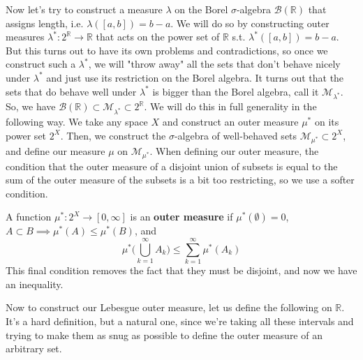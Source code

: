   Now let's try to construct a measure $\lambda$ on the Borel $\sigma$-algebra $\mathcal{B}(\mathbb{R})$ that assigns length, i.e. $\lambda([a, b]) = b - a$. We will do so by constructing outer measures $\lambda^*: 2^\mathbb{R} \longrightarrow \mathbb{R}$ that acts on the power set of $\mathbb{R}$ s.t. $\lambda^*([a, b]) = b - a$. But this turns out to have its own problems and contradictions, so once we construct such a $\lambda^*$, we will "throw away" all the sets that don't behave nicely under $\lambda^*$ and just use its restriction on the Borel algebra. It turns out that the sets that do behave well under $\lambda^*$ is bigger than the Borel algebra, call it $\mathcal{M}_{\lambda^*}$. So, we have $\mathcal{B}(\mathbb{R}) \subset \mathcal{M}_{\lambda^*} \subset 2^\mathbb{R}$. We will do this in full generality in the following way. We take any space $X$ and construct an outer measure $\mu^*$ on its power set $2^X$. Then, we construct the $\sigma$-algebra of well-behaved sets $\mathcal{M}_{\mu^*} \subset 2^X$, and define our measure $\mu$ on $\mathcal{M}_{\mu^*}$. When defining our outer measure, the condition that the outer measure of a disjoint union of subsets is equal to the sum of the outer measure of the subsets is a bit too restricting, so we use a softer condition. 

  \begin{definition}
    A function $\mu^* : 2^X \longrightarrow [0, \infty]$ is an \textbf{outer measure} if $\mu^*(\emptyset) = 0$, $A \subset B \implies \mu^* (A) \leq \mu^*(B)$, and 
    \begin{equation}
      \mu^* \bigg( \bigcup_{k=1}^\infty A_k \bigg) \leq \sum_{k=1}^\infty \mu^* (A_k)
    \end{equation}
    This final condition removes the fact that they must be disjoint, and now we have an inequality. 
  \end{definition}

  Now to construct our Lebesgue outer measure, let us define the following on $\mathbb{R}$. It's a hard definition, but a natural one, since we're taking all these intervals and trying to make them as snug as possible to define the outer measure of an arbitrary set. 

